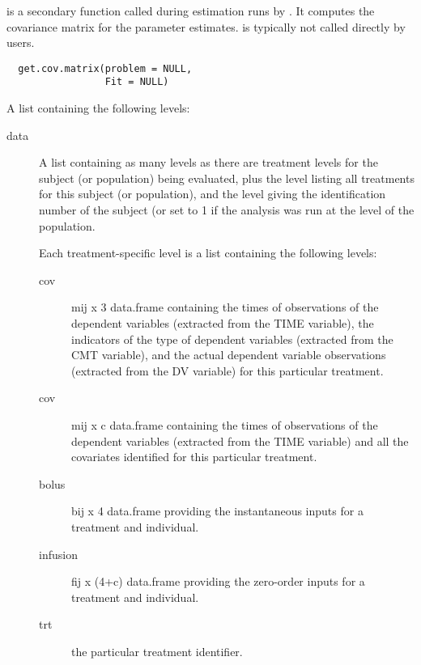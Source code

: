 %
\begin{Description}\relax
{} is a secondary function called during estimation runs by 
. It computes the covariance matrix for the parameter
estimates.  is typically not called directly by users.
\end{Description}
%
\begin{Usage}
\begin{verbatim}
  get.cov.matrix(problem = NULL,
                 Fit = NULL)
\end{verbatim}
\end{Usage}
%
\begin{Arguments}
\begin{ldescription}
\item[\code{problem}] A list containing the following levels:\begin{description}

\item[data] A list containing as many levels as there are treatment levels 
for the subject (or population) being evaluated, plus the  
level listing all treatments for this subject (or population), and the 
 level giving the identification number of the subject (or set to
1 if the analysis was run at the level of the population.

Each treatment-specific level is a list containing the following levels: 
\begin{description}

\item[cov] mij x 3 data.frame containing the times of observations of the
dependent variables (extracted from the TIME variable), the indicators
of the type of dependent variables (extracted from the CMT variable),
and the actual dependent variable observations (extracted from the 
DV variable) for this particular treatment.
\item[cov] mij x c data.frame containing the times of observations of 
the dependent variables (extracted from the TIME variable) and all the
covariates identified for this particular treatment.
\item[bolus] bij x 4 data.frame providing the instantaneous inputs 
for a treatment and individual.
\item[infusion] fij x (4+c) data.frame providing the zero-order inputs for
a treatment and individual.
\item[trt] the particular treatment identifier.
\end{description}



\end{description}
\end{ldescription}
\end{Arguments}
